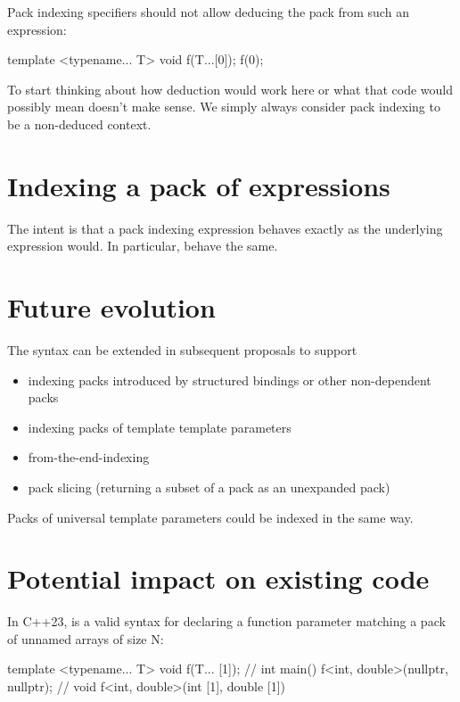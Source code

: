 \documentclass{wg21}
\begin{document}
Pack indexing specifiers should not allow deducing the pack from such an expression:

\begin{colorblock}
template <typename... T>
void f(T...[0]);
f(0);
\end{colorblock}

To start thinking about how deduction would work here or what that code would possibly mean doesn't make sense.
We simply always consider pack indexing to be a non-deduced context.

\section{Indexing a pack of expressions}

The intent is that a pack indexing expression behaves exactly as the underlying expression would.
In particular,  behave the same.

\section{Future evolution}

The syntax can be extended in subsequent proposals to support

\begin{itemize}
\item indexing packs introduced by structured bindings or other non-dependent packs
\item indexing packs of template template parameters
\item from-the-end-indexing
\item pack slicing (returning a subset of a pack as an unexpanded pack)
\end{itemize}
Packs of universal template parameters could be indexed in the same way.


\section{Potential impact on existing code}

In C++23,  is a valid syntax for declaring a function parameter matching a pack of unnamed arrays of size N:

\begin{colorblock}
template <typename... T>
void f(T... [1]); //
int main() {
    f<int, double>(nullptr, nullptr); // void f<int, double>(int [1], double [1])
}
\end{colorblock}
\end{document}
